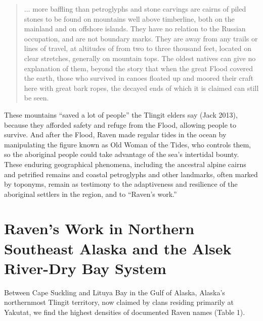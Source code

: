 \begin{quote}
... more baffling than petroglyphs and stone carvings are cairns of piled stones to be found on mountains well above timberline, both on the mainland and on offshore islands. They have no relation to the Russian occupation, and are not boundary marks. They are away from any trails or lines of travel, at altitudes of from two to three thousand feet, located on clear stretches, generally on mountain tops. The oldest natives can give no explanation of them, beyond the story that when the great Flood covered the earth, those who survived in canoes floated up and moored their craft here with great bark ropes, the decayed ends of which it is claimed can still be seen.
\end{quote}
\noindent
These mountains “saved a lot of people” the Tlingit elders say (Jack 2013), because they afforded safety and refuge from the Flood, allowing people to survive. And after the Flood, Raven made regular tides in the ocean by manipulating the figure known as Old Woman of the Tides, who controls them, so the aboriginal people could take advantage of the sea’s intertidal bounty. These enduring geographical phenomena, including the ancestral alpine cairns and petrified remains and coastal petroglyphs and other landmarks, often marked by toponyms, remain as testimony to the adaptiveness and resilience of the aboriginal settlers in the region, and to “Raven’s work.”

\section{Raven’s Work in Northern Southeast Alaska and the Alsek River-Dry Bay System}

Between Cape Suckling and Lituya Bay in the Gulf of Alaska, Alaska’s northernmost Tlingit territory, now claimed by clans residing primarily at Yakutat, we find the highest densities of documented Raven names (Table 1).

